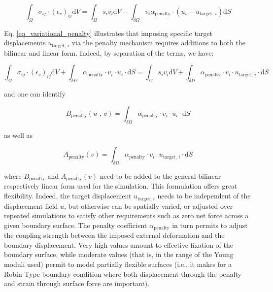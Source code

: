 \documentclass[11pt]{amsart}
\begin{document}
\begin{equation}
\int_\Omega \sigma_{ij}\cdot \left(\epsilon_v\right)_{ij}  \text{d}V=\int_\Omega s_i v_i \text{d}V-\int_{\delta\Omega} v_i\alpha_\text{penalty}\cdot \left(u_i - u_{\text{target, }i}\right)\text{d}S \label{eq_variational_penalty}
\end{equation}

Eq. \ref{eq_variational_penalty} illustrates that imposing specific target displacements $ u_{\text{target, }i}$ via the penalty mechanism requires additions to both the bilinear and linear form. Indeed, by separation of the terms, we have:

\begin{equation}
\int_\Omega \sigma_{ij}\cdot \left(\epsilon_v\right)_{ij}  \text{d}V+\int_{\delta\Omega} \alpha_\text{penalty}\cdot v_i \cdot u_i \cdot \text{d}S=\int_\Omega s_i v_i \text{d}V+\int_{\delta\Omega}\alpha_\text{penalty} \cdot v_i\cdot u_{\text{target, }i}\cdot \text{d}S
\end{equation}

and one can identify

\begin{equation}
B_\text{penalty}\left(u\text{ , }v\right)=\int_{\delta\Omega} \alpha_\text{penalty}\cdot v_i \cdot u_i \cdot \text{d}S \label{eq_B_penalty}
\end{equation}

as well as

\begin{equation}
A_\text{penalty}\left(v\right)=\int_{\delta\Omega}\alpha_\text{penalty} \cdot v_i\cdot u_{\text{target, }i}\cdot \text{d}S \label{eq_A_penalty}
\end{equation}


where $B_\text{penalty}$ and $A_\text{penalty}\left(v\right)$ need to be added to the general bilinear respectively linear form used for the simulation. This formulation offers great flexibility. Indeed, the target displacement $u_{\text{target, }i}$ needs to be independent of the displacement field $u$, but otherwise can be spatially varied, or adjusted over repeated simulations to satisfy other requirements such as zero net force across a given boundary surface. The penalty coefficient $\alpha_\text{penalty}$ in turn permits to adjust the coupling strength between the imposed external deformation and the boundary displacement. Very high values amount to effective fixation of the boundary surface\cite{babuska_finite_1973}, while moderate values (that is, in the range of the Young moduli used) permit to model partially flexible surfaces (i.e., it makes for a Robin-Type boundary condition\cite{gustafson_third_1998} where both displacement through the penalty and strain through surface force are important). 
\end{document}

